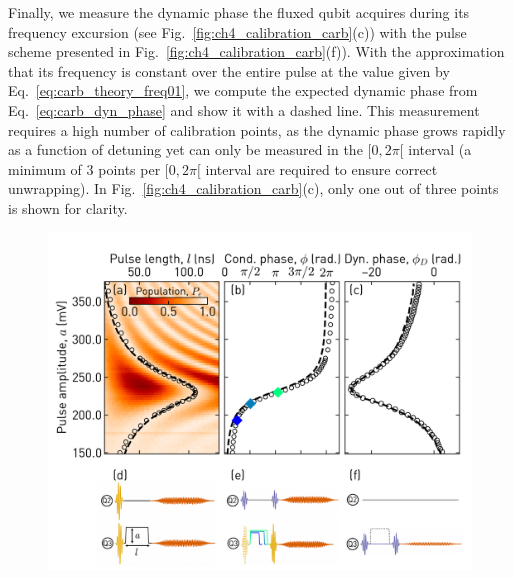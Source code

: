 Finally, we measure the dynamic phase the fluxed qubit acquires during its frequency excursion (see Fig.~\ref{fig:ch4_calibration_carb}(c)) with the pulse scheme presented in Fig.~\ref{fig:ch4_calibration_carb}(f)). With the approximation that its frequency is constant over the entire pulse at the value given by Eq.~\eqref{eq:carb_theory_freq01}, we compute the expected dynamic phase from Eq.~\eqref{eq:carb_dyn_phase} and show it with a dashed line. This measurement requires a high number of calibration points, as the dynamic phase grows rapidly as a function of detuning yet can only be measured in the $[0, 2\pi[$ interval (a minimum of 3 points per $[0, 2\pi[$ interval are required to ensure correct unwrapping). In Fig.~\ref{fig:ch4_calibration_carb}(c), only one out of three points is shown for clarity. 
\begin{figure}[H]
    \centering
    \includegraphics[width=\textwidth]{chapters/carb_gate/figs/ch4_carb_calibration_20200406_215519.pdf}

\end{figure}
